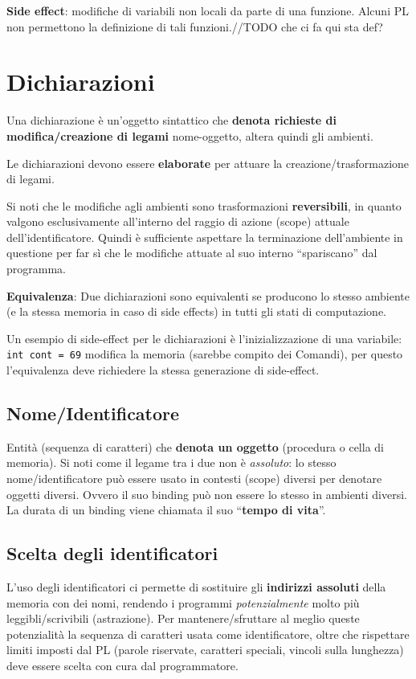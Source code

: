 \documentclass[12pt,a4paper]{article}
\newcommand{\barra}{/\hspace{0pt}}
\begin{document}
\textbf{Side effect}: modifiche di variabili non locali da parte di una funzione. Alcuni PL non permettono la definizione di tali funzioni.//TODO che ci fa qui sta def?
\section{Dichiarazioni} \label{Dichiarazioni}
Una dichiarazione è un'oggetto sintattico che \textbf{denota richieste di modifica\slash creazione di legami} nome-oggetto, altera quindi gli ambienti.

Le dichiarazioni devono essere \textbf{elaborate} per attuare la creazione\barra trasformazione di legami.

Si noti che le modifiche agli ambienti sono trasformazioni \textbf{reversibili}, in quanto valgono esclusivamente all'interno del raggio di azione (scope) attuale dell'identificatore. Quindi è sufficiente aspettare la terminazione dell'ambiente in questione per far sì che le modifiche attuate al suo interno ``spariscano'' dal programma.

\textbf{Equivalenza}: Due dichiarazioni sono equivalenti se producono lo stesso ambiente (e la stessa memoria in caso di side effects) in tutti gli stati di computazione.

Un esempio di side-effect per le dichiarazioni è l'inizializzazione di una variabile: \texttt{int cont = 69} modifica la memoria (sarebbe compito dei Comandi), per questo l'equivalenza deve richiedere la stessa generazione di side-effect.

\subsection{Nome/Identificatore}
Entità (sequenza di caratteri) che \textbf{denota un oggetto} (procedura o cella di memoria).
Si noti come il legame tra i due non è \textit{assoluto}: lo stesso nome\barra identificatore può essere usato in contesti (scope) diversi per denotare oggetti diversi. Ovvero il suo binding può non essere lo stesso in ambienti diversi. La durata di un binding viene chiamata il suo ``\textbf{tempo di vita}''.
\subsection{Scelta degli identificatori}
L'uso degli identificatori ci permette di sostituire gli \textbf{indirizzi assoluti} della memoria con dei nomi, rendendo i programmi \textit{potenzialmente} molto più leggibli\slash scrivibili (astrazione). Per mantenere\slash sfruttare al meglio queste potenzialità la sequenza di caratteri usata come identificatore, oltre che rispettare limiti imposti dal PL (parole riservate, caratteri speciali, vincoli sulla lunghezza) deve essere scelta con cura dal programmatore.
\end{document}
